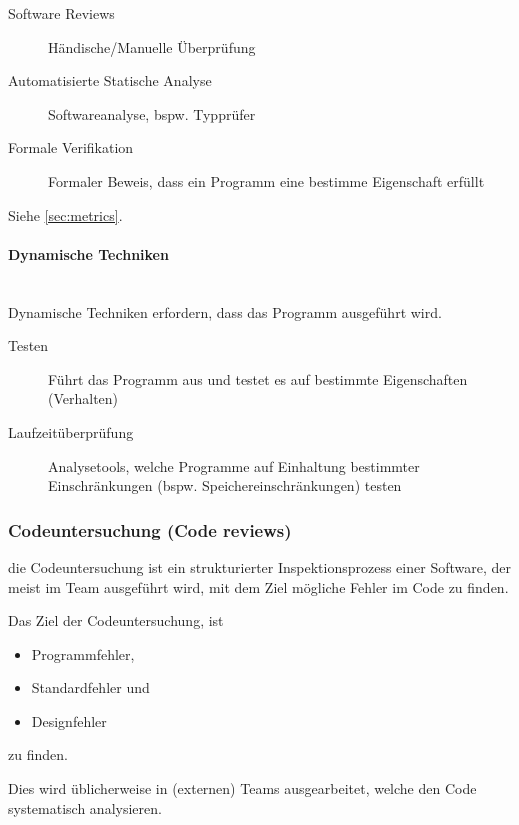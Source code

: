 \documentclass[
    ngerman,
    color=3b,
    summary,
    boxarc,
    main,
]{rubos-tuda-template}
\begin{document}
\begin{description}
    \item[Software Reviews] Händische/Manuelle Überprüfung
    \item[Automatisierte Statische Analyse] Softwareanalyse, bspw. Typprüfer
    \item[Formale Verifikation] Formaler Beweis, dass ein Programm eine bestimme Eigenschaft erfüllt
\end{description}

Siehe \ref{sec:metrics}.

\paragraph{Dynamische Techniken}\mbox{}\\
Dynamische Techniken erfordern, dass das Programm ausgeführt wird.

\begin{description}
    \item[Testen] Führt das Programm aus und testet es auf bestimmte Eigenschaften (Verhalten)
    \item[Laufzeitüberprüfung] Analysetools, welche Programme auf Einhaltung bestimmter Einschränkungen (bspw. Speichereinschränkungen) testen
\end{description}

\clearpage
\subsubsection{Codeuntersuchung (Code reviews)}
\begin{definition}
    die Codeuntersuchung ist ein strukturierter Inspektionsprozess einer Software,
    der meist im Team ausgeführt wird, mit dem Ziel mögliche Fehler im Code zu finden.
\end{definition}
Das Ziel der Codeuntersuchung, ist
\begin{itemize}
    \item Programmfehler,
    \item Standardfehler und
    \item Designfehler
\end{itemize}
zu finden.

Dies wird üblicherweise in (externen) Teams ausgearbeitet, welche den Code systematisch analysieren.
\end{document}
